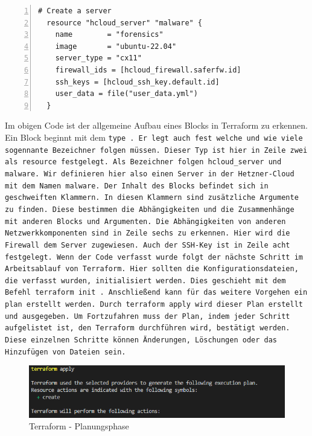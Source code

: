 \begin{otherlanguage}{ngerman}
\begin{lstlisting}[numbers=left, stepnumber=1, numberstyle = \tiny]
  # Create a server
  resource "hcloud_server" "malware" {
    name        = "forensics"
    image       = "ubuntu-22.04"
    server_type = "cx11"
    firewall_ids = [hcloud_firewall.saferfw.id]
    ssh_keys = [hcloud_ssh_key.default.id]
    user_data = file("user_data.yml")
  }
\end{lstlisting}
\newline
\newline
Im obigen Code ist der allgemeine Aufbau eines Blocks in Terraform zu erkennen. Ein Block beginnt mit dem \tt type \rm . Er legt auch fest welche und wie viele sogennante Bezeichner folgen müssen. Dieser Typ ist hier in Zeile zwei als \dq resource \dq{} festgelegt. Als Bezeichner folgen \dq hcloud\_server \dq{} und \dq malware\dq{}. Wir definieren hier also einen Server in der Hetzner-Cloud mit dem Namen \dq malware\dq{}. Der Inhalt des Blocks befindet sich in geschweiften Klammern. In diesen Klammern sind zusätzliche Argumente zu finden. Diese bestimmen die Abhängigkeiten und die Zusammenhänge mit anderen Blocks und Argumenten. Die Abhängigkeiten von anderen Netzwerkkomponenten sind in Zeile sechs zu erkennen. Hier wird die Firewall dem Server zugewiesen. Auch der SSH-Key ist in Zeile acht festgelegt.
\newline
Wenn der Code verfasst wurde folgt der nächste Schritt im Arbeitsablauf von Terraform. Hier sollten die Konfigurationsdateien, die verfasst wurden, initialisiert werden. Dies geschieht mit dem Befehl \tt terraform init \tt. Anschließend kann für das weitere Vorgehen ein plan erstellt werden. Durch \tt terraform apply \rm wird dieser Plan erstellt und ausgegeben. Um Fortzufahren muss der Plan, indem jeder Schritt aufgelistet ist, den Terraform durchführen wird, bestätigt werden. Diese einzelnen Schritte können Änderungen, Löschungen oder das Hinzufügen von Dateien sein.
\newline
\begin{figure}[h]
    \centering
    \includegraphics{LaTeX/graphic/terraformapply.png}
    \caption{Terraform - Planungsphase}
\end{figure}
\newline 
 

\end{otherlanguage}

